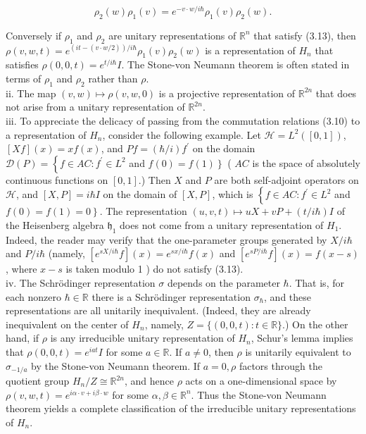 \documentclass[10pt, letterpaper]{article}
\begin{document}
$$
\rho_{2}(w) \rho_{1}(v)=e^{-v \cdot w / i \hbar} \rho_{1}(v) \rho_{2}(w) .
$$

Conversely if $\rho_{1}$ and $\rho_{2}$ are unitary representations of $\mathbb{R}^{n}$ that satisfy (3.13), then $\rho(v, w, t)=e^{(i t-(v \cdot w / 2)) / i \hbar} \rho_{1}(v) \rho_{2}(w)$ is a representation of $H_{n}$ that satisfies $\rho(0,0, t)=e^{t / i \hbar} I$. The Stone-von Neumann theorem is often stated in terms of $\rho_{1}$ and $\rho_{2}$ rather than $\rho$.\\
ii. The map $(v, w) \mapsto \rho(v, w, 0)$ is a projective representation of $\mathbb{R}^{2 n}$ that does not arise from a unitary representation of $\mathbb{R}^{2 n}$.\\
iii. To appreciate the delicacy of passing from the commutation relations (3.10) to a representation of $H_{n}$, consider the following example. Let $\mathcal{H}=L^{2}([0,1])$, $[X f](x)=x f(x)$, and $P f=(\hbar / i) f^{\prime}$ on the domain $\mathcal{D}(P)=\left\{f \in A C: f^{\prime} \in\right. L^{2}$ and $\left.f(0)=f(1)\right\}$ ( $A C$ is the space of absolutely continuous functions on $[0,1]$.) Then $X$ and $P$ are both self-adjoint operators on $\mathcal{H}$, and $[X, P]=i \hbar I$ on the domain of $[X, P]$, which is $\left\{f \in A C: f^{\prime} \in L^{2}\right.$ and $\left.f(0)=f(1)=0\right\}$. The representation $(u, v, t) \mapsto u X+v P+(t / i \hbar) I$ of the Heisenberg algebra $\mathfrak{h}_{1}$ does not come from a unitary representation of $H_{1}$. Indeed, the reader may verify that the one-parameter groups generated by $X / i \hbar$ and $P / i \hbar$ (namely, $\left[e^{s X / i \hbar} f\right](x)=e^{s x / i \hbar} f(x)$ and $\left[e^{s P / i \hbar} f\right](x)=f(x-s)$, where $x-s$ is taken modulo 1 ) do not satisfy (3.13).\\
iv. The Schrödinger representation $\sigma$ depends on the parameter $\hbar$. That is, for each nonzero $\hbar \in \mathbb{R}$ there is a Schrödinger representation $\sigma_{\hbar}$, and these representations are all unitarily inequivalent. (Indeed, they are already inequivalent on the center of $H_{n}$, namely, $Z=\{(0,0, t): t \in \mathbb{R}\}$.) On the other hand, if $\rho$ is any irreducible unitary representation of $H_{n}$, Schur's lemma implies that $\rho(0,0, t)=e^{i a t} I$ for some $a \in \mathbb{R}$. If $a \neq 0$, then $\rho$ is unitarily equivalent to $\sigma_{-1 / a}$ by the Stone-von Neumann theorem. If $a=0, \rho$ factors through the quotient group $H_{n} / Z \cong \mathbb{R}^{2 n}$, and hence $\rho$ acts on a one-dimensional space by $\rho(v, w, t)=e^{i \alpha \cdot v+i \beta \cdot w}$ for some $\alpha, \beta \in \mathbb{R}^{n}$. Thus the Stone-von Neumann theorem yields a complete classification of the irreducible unitary representations of $H_{n}$.
\end{document}
